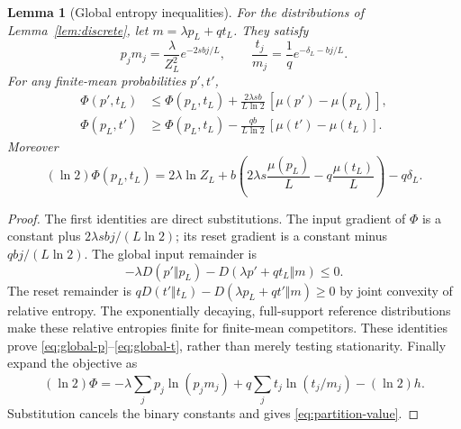 \documentclass[11pt]{article}
\newtheorem{lemma}[theorem]{Lemma}
\begin{document}
\begin{lemma}[Global entropy inequalities]\label{lem:global}
For the distributions of Lemma~\ref{lem:discrete}, let $m=\lambda p_L+qt_L$. They satisfy
\[
 p_jm_j=\frac{\lambda}{Z_L^2}e^{-2sbj/L},\qquad
 \frac{t_j}{m_j}=\frac1q e^{-\delta_L-bj/L}.
\]
For any finite-mean probabilities $p',t'$,
\begin{align}
 \Phi(p',t_L)&\le\Phi(p_L,t_L)+\frac{2\lambda sb}{L\ln2}\,[\mu(p')-\mu(p_L)],\label{eq:global-p}\\
 \Phi(p_L,t')&\ge\Phi(p_L,t_L)-\frac{qb}{L\ln2}\,[\mu(t')-\mu(t_L)].\label{eq:global-t}
\end{align}
Moreover
\begin{equation}\label{eq:partition-value}
 (\ln2)\Phi(p_L,t_L)=2\lambda\ln Z_L+
 b\left(2\lambda s\frac{\mu(p_L)}L-q\frac{\mu(t_L)}L\right)-q\delta_L.
\end{equation}
\end{lemma}
\begin{proof}
The first identities are direct substitutions. The input gradient of $\Phi$ is a constant plus $2\lambda sbj/(L\ln2)$; its reset gradient is a constant minus $qbj/(L\ln2)$. The global input remainder is
\[
 -\lambda D(p'\Vert p_L)-D(\lambda p'+qt_L\Vert m)\le0.
\]
The reset remainder is $qD(t'\Vert t_L)-D(\lambda p_L+qt'\Vert m)\ge0$ by joint convexity of relative entropy. The exponentially decaying, full-support reference distributions make these relative entropies finite for finite-mean competitors. These identities prove \eqref{eq:global-p}--\eqref{eq:global-t}, rather than merely testing stationarity. Finally expand the objective as
\[
 (\ln2)\Phi=-\lambda\sum_jp_j\ln(p_jm_j)+q\sum_jt_j\ln(t_j/m_j)-(\ln2)h.
\]
Substitution cancels the binary constants and gives \eqref{eq:partition-value}.
\end{proof}
\end{document}
